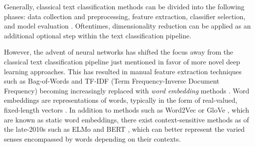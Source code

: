 \documentclass[english,bachelor,ul]{webisthesis} %
\begin{document}
Generally, classical text classification methods can be divided into the following phases: data collection and preprocessing, feature extraction, classifier selection, and model evaluation \citep{DBLP:journals/information/KowsariMHMBB19, DBLP:journals/eswa/MironczukP18, ikonomakis2005text}. Oftentimes, dimensionality reduction can be applied as an additional optional step within the text classification pipeline.

However, the advent of neural networks has shifted the focus away from the classical text classification pipeline just mentioned in favor of more novel deep learning approaches. This has resulted in manual feature extraction techniques such as Bag-of-Words and TF-IDF (Term Frequency-Inverse Document Frequency) becoming increasingly replaced with \textit{word embedding} methods \citep{DBLP:journals/csur/MinaeeKCNCG21}. Word embeddings are representations of words, typically in the form of real-valued, fixed-length vectors \citep{DBLP:journals/corr/abs-1901-09069}. In addition to methods such as Word2Vec \citep{DBLP:journals/corr/abs-1301-3781, DBLP:conf/nips/MikolovSCCD13} or GloVe \citep{DBLP:conf/emnlp/PenningtonSM14}, which are known as static word embeddings, there exist context-sensitive methods as of the late-2010s such as ELMo and BERT \citep{DBLP:conf/naacl/PetersNIGCLZ18, DBLP:conf/naacl/DevlinCLT19}, which can better represent the varied senses encompassed by words depending on their contexts.
\end{document}

